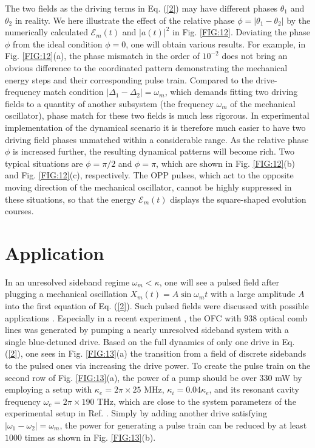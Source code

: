 \documentclass[a4paper,fleqn]{cas-dc}
\begin{document}
The two fields as the driving terms in Eq. (\ref{2}) may have different phases $\theta_1$ and $\theta_2$ in reality. We here illustrate the effect of the relative phase $\phi=|\theta_1-\theta_2|$ by the numerically calculated $\mathcal{E}_m(t)$ and $|a(t)|^2$ in Fig. \ref{FIG:12}. Deviating the phase $\phi$ from the ideal condition $\phi=0$, one will obtain various results. For example, in Fig. \ref{FIG:12}(a), the phase mismatch in the order of $10^{-2}$ does not bring an obvious difference to the coordinated pattern demonstrating the mechanical energy steps and their corresponding pulse train. Compared to the drive-frequency match condition $|\Delta_1-\Delta_2|=\omega_m$, which demands fitting two driving fields to a quantity of another subsystem (the frequency $\omega_m$ of the mechanical oscillator), phase match for these two fields is much less rigorous. In experimental implementation of the dynamical scenario it is therefore much easier to 
have two driving field phases unmatched within a considerable range. As the relative phase $\phi$ is increased further, the resulting dynamical patterns will become rich. Two typical situations are $\phi=\pi/2$ and $\phi=\pi$, which are shown in Fig. \ref{FIG:12}(b) and Fig. \ref{FIG:12}(c), respectively. The OPP pulses, which act to the opposite moving direction of the mechanical oscillator, cannot be highly suppressed in these situations, so that the energy $\mathcal{E}_m(t)$ displays the square-shaped evolution courses.


\section{Application}

In an unresolved sideband regime $\omega_m<\kappa$, one will see a pulsed field after plugging a mechanical oscillation $X_m(t)=A\sin\omega_mt$ with a large amplitude $A$ into the first equation of Eq. (\ref{2}). Such pulsed fields were discussed with possible applications \cite{miri2018optomechanical,xu2021chip}. Especially in a recent experiment \cite{hu2021generation}, the OFC with $938$ optical comb lines was generated by pumping a nearly unresolved sideband system with a single blue-detuned drive. Based on the full dynamics of only one drive in Eq. (\ref{2}), one sees in Fig. \ref{FIG:13}(a) the transition from a field of discrete sidebands to the pulsed ones via increasing the drive power. To create the pulse train on the second row of Fig. \ref{FIG:13}(a), the power of a pump should be over $330$ mW by employing a setup with $\kappa_e=2\pi \times 25$ MHz, $\kappa_i=0.04\kappa_e$, and its resonant cavity frequency $\omega_c=2\pi \times 190$ THz, which are close to the system parameters of the experimental setup in Ref. \cite{hu2021generation}. Simply by adding another drive satisfying $|\omega_1-\omega_2|=\omega_m$, the power for generating a pulse train can be reduced by at least $1000$ times as shown in Fig. \ref{FIG:13}(b). 
\end{document}
